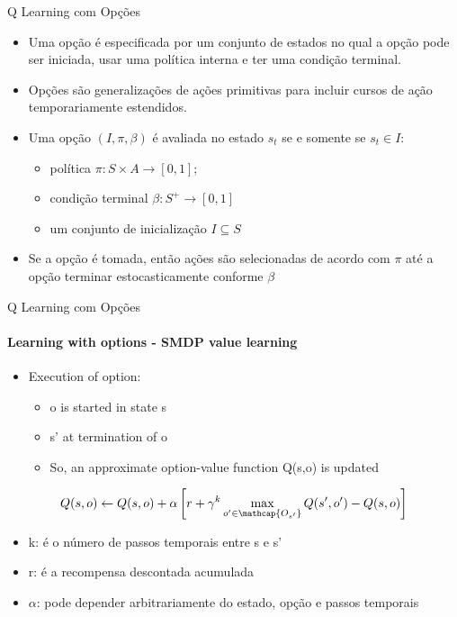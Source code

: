 \begin{frame}{Q Learning com Opções}
    \begin{itemize}
        \item Uma opção é especificada por um conjunto de estados no qual a opção pode \alert{ser iniciada, usar uma política interna e ter uma condição terminal}. \nocite{stolle2002learning}
        \item Opções são generalizações de ações primitivas para incluir \alert{cursos de ação temporariamente estendidos}. \nocite{precup2000temporal, Sutton1999a}
            
        \item Uma \alert{opção $(I, \pi, \beta)$} é avaliada no estado $s_t$ se e somente se $s_t \in I $:
        \begin{itemize}
            \item política $\pi:S \times A \rightarrow [0,1]$;
            \item condição terminal $\beta : S^+ \rightarrow [0,1]$
            \item um conjunto de inicialização $I \subseteq S$
        \end{itemize}
        \item Se a opção é tomada, então ações são selecionadas de acordo com $\pi$ até a opção terminar estocasticamente conforme $\beta$
    \end{itemize}
\end{frame}

\begin{frame}{Q Learning com Opções}
    \framesubtitle{Learning with options - SMDP value learning}
    \begin{itemize}
        \item Execution of option:
        \begin{itemize}
            \item o is started in state s
            \item s' at termination of o 
            \item So, an approximate option-value function Q(s,o) is updated
        \end{itemize}
    \end{itemize}
    $$Q(s,o) \leftarrow Q(s,o) + \alpha \left [ r + \gamma^k \max_{o' \in \mathcap{O_{s'}} } Q(s',o') - Q(s,o)\right ]$$
    \begin{itemize}
        \begin{itemize}
            \item k: é o número de passos temporais entre s e s'
            \item r: é a recompensa descontada acumulada
            \item $\alpha$: pode depender arbitrariamente do estado, opção e passos temporais
        \end{itemize}
    \end{itemize}
\end{frame}

